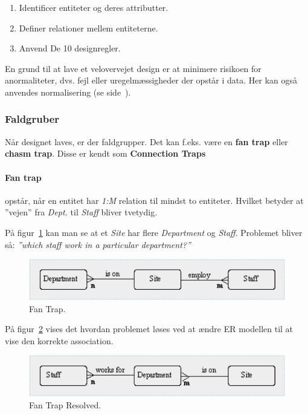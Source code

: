 \begin{enumerate}
	\item Identificer entiteter og deres attributter.
	\item Definer relationer mellem entiteterne.
	\item Anvend De 10 designregler.
\end{enumerate}

En grund til at lave et velovervejet design er at minimere risikoen for anormaliteter, dvs. fejl eller uregelmæssigheder der opstår i data. Her kan også anvendes normalisering (se side~\pageref{sec:normal}).

\subsubsection{Faldgruber}
Når designet laves, er der faldgrupper. Det kan f.eks. være en \textbf{fan trap} eller \textbf{chasm trap}. Disse er kendt som \textbf{Connection Traps} 

\paragraph{Fan trap} opstår, når en entitet har \textit{1:M} relation til mindst to entiteter. Hvilket betyder at ''vejen'' fra \textit{Dept.} til \textit{Staff} bliver tvetydig. 

På figur~\ref{fig:fan} kan man se at et \textit{Site} har flere \textit{Department} og \textit{Staff}. Problemet bliver så: \textit{''which staff work in a particular department?''}

\begin{figure}[h]
\centering
\includegraphics[width=0.8\linewidth]{figs/spm2/fan}
\caption{Fan Trap.}
\label{fig:fan}
\end{figure}

På figur~\ref{fig:fan_solved} vises det hvordan problemet løses ved at ændre ER modellen til at vise den korrekte association.

\begin{figure}[h]
\centering
\includegraphics[width=0.8\linewidth]{figs/spm2/fan_solved}
\caption{Fan Trap Resolved.}
\label{fig:fan_solved}
\end{figure}

